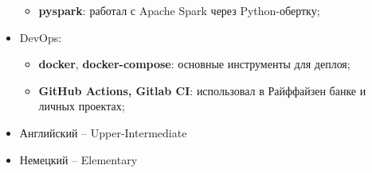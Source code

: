 \begin{itemize}
\begin{itemize}
            \item \textbf{pyspark}: работал с Apache Spark через Python-обертку;
        \end{itemize}
    \item DevOps:
        \begin{itemize}
            \item \textbf{docker}, \textbf{docker-compose}: основные инструменты для деплоя;
            \item \textbf{GitHub Actions, Gitlab CI}: использовал в Райффайзен банке и личных проектах;
        \end{itemize}
\end{itemize}








\begin{itemize}
	\item Английский -- Upper-Intermediate
    \item Немецкий -- Elementary
\end{itemize}

